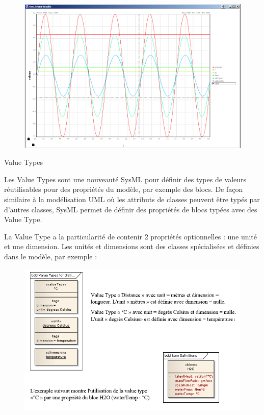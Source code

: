 \documentclass[12pt,a4paper]{report}
\begin{document}
\begin{figure}[H]
	\centering
	\includegraphics[width=0.8\linewidth]{image18.png}
	
	
\end{figure}

\noindent \begin{flushleft}
	
	
	\noindent Value Types
	
	\noindent Les Value Types sont une nouveaut\'{e} SysML pour d\'{e}finir des types de valeurs r\'{e}utilisables pour des propri\'{e}t\'{e}s du mod\`{e}le, par exemple des blocs. De fa\c{c}on similaire \`{a} la mod\'{e}lisation UML o\`{u} les attributs de classes peuvent \^{e}tre typ\'{e}s par d'autres classes, SysML permet de d\'{e}finir des propri\'{e}t\'{e}s de blocs typ\'{e}es avec des Value Type.
	
	\noindent La Value Type a la particularit\'{e} de contenir 2 propri\'{e}t\'{e}s optionnelles : une unit\'{e} et une dimension. Les unit\'{e}s et dimensions sont des classes sp\'{e}cialis\'{e}es et d\'{e}finies dans le mod\`{e}le, par exemple :
	
	\begin{figure}[H]
		\centering
		\includegraphics[width=0.8\linewidth]{Capture3.png}
		
	\end{figure}
	
	\newpage
	
\end{flushleft}
\end{document}
